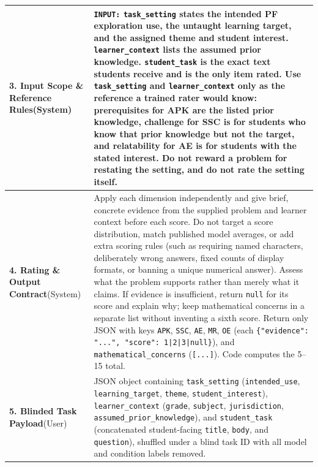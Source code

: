 {\begin{table}[!htbp]
{\begin{tabular}{@{} >{\raggedright\arraybackslash}p{} >{\raggedright\arraybackslash}p{} @{}}
\midrule
\textbf{3. Input Scope \& Reference Rules}\newline (System) &
\texttt{INPUT:} \texttt{task\_setting} states the intended PF exploration use, the untaught learning target, and the assigned theme and student interest. \texttt{learner\_context} lists the assumed prior knowledge. \texttt{student\_task} is the exact text students receive and is the only item rated. Use \texttt{task\_setting} and \texttt{learner\_context} only as the reference a trained rater would know: prerequisites for APK are the listed prior knowledge, challenge for SSC is for students who know that prior knowledge but not the target, and relatability for AE is for students with the stated interest. Do not reward a problem for restating the setting, and do not rate the setting itself. \\
\midrule
\textbf{4. Rating \& Output Contract}\newline (System) &
Apply each dimension independently and give brief, concrete evidence from the supplied problem and learner context before each score. Do not target a score distribution, match published model averages, or add extra scoring rules (such as requiring named characters, deliberately wrong answers, fixed counts of display formats, or banning a unique numerical answer). Assess what the problem supports rather than merely what it claims. If evidence is insufficient, return \texttt{null} for its score and explain why; keep mathematical concerns in a separate list without inventing a sixth score. Return only JSON with keys \texttt{APK}, \texttt{SSC}, \texttt{AE}, \texttt{MR}, \texttt{OE} (each \texttt{\{"evidence": "...", "score": 1|2|3|null\}}), and \texttt{mathematical\_concerns} (\texttt{[...]}). Code computes the 5--15 total. \\
\midrule
\textbf{5. Blinded Task Payload}\newline (User) &
JSON object containing \texttt{task\_setting} (\texttt{intended\_use}, \texttt{learning\_target}, \texttt{theme}, \texttt{student\_interest}), \texttt{learner\_context} (\texttt{grade}, \texttt{subject}, \texttt{jurisdiction}, \texttt{assumed\_prior\_knowledge}), and \texttt{student\_task} (concatenated student-facing \texttt{title}, \texttt{body}, and \texttt{question}), shuffled under a blind task ID with all model and condition labels removed. \\
\bottomrule
\end{tabular}
}
\end{table}
\clearpage
}

